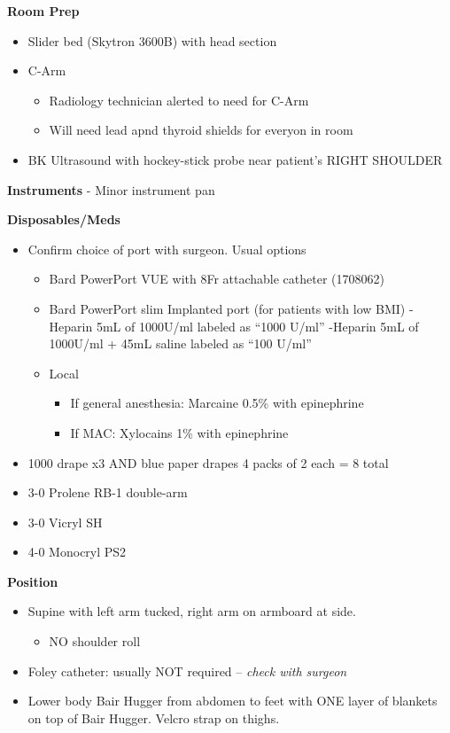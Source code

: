 \documentclass[
]{book}
\providecommand{\tightlist}{%
  \setlength{\itemsep}{0pt}\setlength{\parskip}{0pt}}
\begin{document}
\textbf{Room Prep}

\begin{itemize}
\tightlist
\item
  Slider bed (Skytron 3600B) with head section
\item
  C-Arm

  \begin{itemize}
  \tightlist
  \item
    Radiology technician alerted to need for C-Arm
  \item
    Will need lead apnd thyroid shields for everyon in room
  \end{itemize}
\item
  BK Ultrasound with hockey-stick probe near patient's RIGHT SHOULDER
\end{itemize}

\textbf{Instruments}
- Minor instrument pan

\textbf{Disposables/Meds}

\begin{itemize}
\tightlist
\item
  Confirm choice of port with surgeon. Usual options

  \begin{itemize}
  \tightlist
  \item
    Bard PowerPort VUE with 8Fr attachable catheter (1708062)
  \item
    Bard PowerPort slim Implanted port (for patients with low BMI)
    -Heparin 5mL of 1000U/ml labeled as ``1000 U/ml''
    -Heparin 5mL of 1000U/ml + 45mL saline labeled as ``100 U/ml''
  \item
    Local

    \begin{itemize}
    \tightlist
    \item
      If general anesthesia: Marcaine 0.5\% with epinephrine
    \item
      If MAC: Xylocains 1\% with epinephrine
    \end{itemize}
  \end{itemize}
\item
  1000 drape x3 AND blue paper drapes 4 packs of 2 each = 8 total
\item
  3-0 Prolene RB-1 double-arm
\item
  3-0 Vicryl SH
\item
  4-0 Monocryl PS2
\end{itemize}

\textbf{Position}

\begin{itemize}
\tightlist
\item
  Supine with left arm tucked, right arm on armboard at side.

  \begin{itemize}
  \tightlist
  \item
    NO shoulder roll
  \end{itemize}
\item
  Foley catheter: usually NOT required -- \emph{check with surgeon}
\item
  Lower body Bair Hugger from abdomen to feet with ONE layer of blankets on top of Bair Hugger. Velcro strap on thighs.
\end{itemize}
\end{document}
